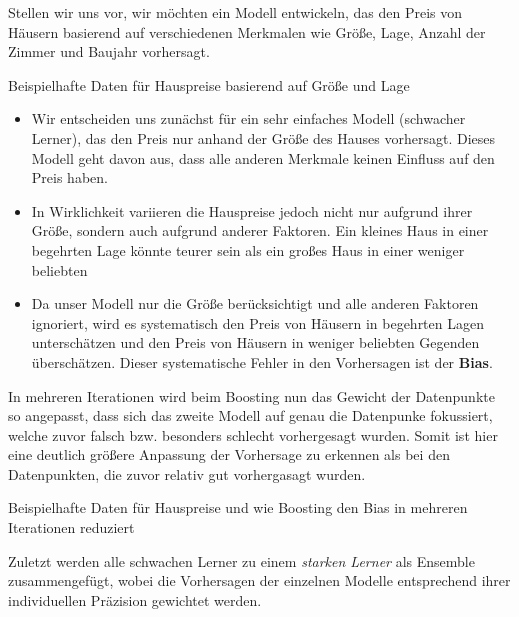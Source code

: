 Stellen wir uns vor, wir möchten ein Modell entwickeln, das den Preis von
Häusern basierend auf verschiedenen Merkmalen wie Größe, Lage, Anzahl der
Zimmer und Baujahr vorhersagt.

\begin{table}[h]
    \centering
    
    \caption{Beispielhafte Daten für Hauspreise basierend auf Größe und Lage}
\end{table}

\begin{itemize}
    \item Wir entscheiden uns zunächst für ein sehr einfaches Modell (schwacher Lerner),
          das den Preis nur anhand der Größe des Hauses vorhersagt.
          Dieses Modell geht davon aus, dass alle anderen Merkmale keinen
          Einfluss auf den Preis haben.
    \item In Wirklichkeit variieren die Hauspreise jedoch nicht nur aufgrund
          ihrer Größe, sondern auch aufgrund anderer Faktoren. Ein kleines Haus in einer
          begehrten Lage könnte teurer sein als ein großes Haus in einer weniger beliebten
    \item Da unser Modell nur die Größe berücksichtigt und alle anderen Faktoren ignoriert,
          wird es systematisch den Preis von Häusern in begehrten Lagen unterschätzen und den Preis
          von Häusern in weniger beliebten Gegenden überschätzen. Dieser systematische Fehler in den
          Vorhersagen ist der \textbf{Bias}.
\end{itemize}

In mehreren Iterationen wird beim Boosting nun das Gewicht der Datenpunkte so angepasst, dass sich das
zweite Modell auf genau die Datenpunke fokussiert, welche zuvor falsch bzw. besonders schlecht vorhergesagt wurden.
Somit ist hier eine deutlich größere Anpassung der Vorhersage zu erkennen als bei den Datenpunkten, die zuvor
relativ gut vorhergasagt wurden.

\begin{table}
    \centering
    
    
    \caption{Beispielhafte Daten für Hauspreise und wie Boosting den Bias in mehreren Iterationen reduziert}
\end{table}
Zuletzt werden alle schwachen Lerner zu einem \emph{starken Lerner} als Ensemble zusammengefügt, wobei die Vorhersagen
der einzelnen Modelle entsprechend ihrer individuellen Präzision gewichtet werden.